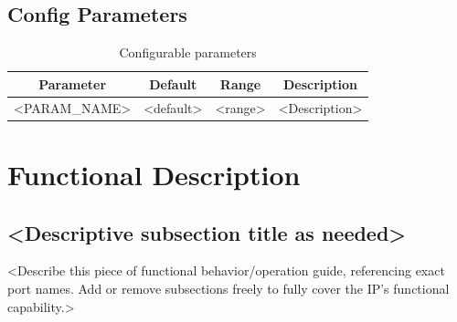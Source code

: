 \documentclass[10pt,a4paper]{article}
\begin{document}
\subsection{Config Parameters}

\begin{table}[H]
\centering
\renewcommand{\arraystretch}{1.2}

\begin{tabularx}{\textwidth}{|c|c|c|X|}
\hline
\textbf{Parameter} &
\textbf{Default} &
\textbf{Range} &
\multicolumn{1}{c|}{\textbf{Description}} \\
\hline

<PARAM\_NAME> & <default> & <range> & <Description> \\
\hline

\end{tabularx}

\caption{Configurable parameters}
\label{tab:parameters}
\end{table}


\section{Functional Description}
 
 
\subsection{<Descriptive subsection title as needed>}
 
<Describe this piece of functional behavior/operation guide,
referencing exact port names. Add or remove subsections freely
to fully cover the IP's functional capability.>
\end{document}
